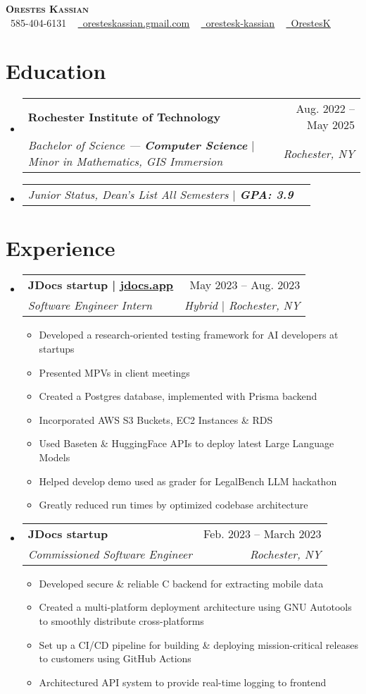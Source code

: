 \documentclass[letterpaper,11pt]{article}
\makeatletter
\newcommand{\resumeItem}[1]{
  \item\small{
    {#1 \vspace{-2pt}}
  }
}
\newcommand{\resumeSubheading}[4]{
  \vspace{-2pt}\item
    \begin{tabular*}{0.97\textwidth}[t]{l@{\extracolsep{\fill}}r}
      \textbf{#1} & #2 \\
      \textit{\small#3} & \textit{\small #4} \\
    \end{tabular*}\vspace{-7pt}
}
\newcommand{\resumeSubSubheading}[2]{
    \item
    \begin{tabular*}{0.97\textwidth}{l@{\extracolsep{\fill}}r}
      \textit{\small#1} & \textit{\small #2} \\
    \end{tabular*}\vspace{-7pt}
}
\newcommand{\resumeSubHeadingListStart}{\begin{itemize}[leftmargin=0.15in, label={}]}
\newcommand{\resumeSubHeadingListEnd}{\end{itemize}}
\newcommand{\resumeItemListStart}{\begin{itemize}}
\newcommand{\resumeItemListEnd}{\end{itemize}\vspace{-5pt}}
\makeatother
\begin{document}
\begin{center}
    \textbf{\Huge \scshape Orestes Kassian} \\ \vspace{4pt}
    \small 
    \faPhone\ 585-404-6131 ~
    \href{oresteskassian@gmail.com}{\faEnvelope\ \uline{oresteskassian.gmail.com}} ~
    \href{https://linkedin.com/in/orestes-kassian}{\faLinkedin\ \uline{orestesk-kassian}} ~
    \href{https://github.com/OrestesK}{\faGithub\ \uline{OrestesK}}
\end{center}
\vspace{-22pt}

\section{Education}
\resumeSubHeadingListStart
    \resumeSubheading
        {Rochester Institute of Technology}{ Aug. 2022 -- May 2025}
        {Bachelor of Science --- \textbf{Computer Science} $|$ Minor in Mathematics, GIS Immersion}{ Rochester, NY}
    \vspace{-8pt}
    \resumeSubSubheading
    {Junior Status, Dean’s List All Semesters $|$ \textbf{GPA: 3.9}}{}
\resumeSubHeadingListEnd

\section{Experience}
\resumeSubHeadingListStart
    \resumeSubheading
    {JDocs startup | \href{https://www.jdocs.app/}{\uline{jdocs.app}}}{ May 2023 -- Aug. 2023}
        {Software Engineer Intern}{ Hybrid $|$ Rochester, NY}
    \resumeItemListStart
        \resumeItem{Developed a research-oriented testing framework for AI developers at startups}
        \resumeItem{Presented MPVs in client meetings}
        \resumeItem{Created a Postgres database, implemented with Prisma backend}
        \resumeItem{Incorporated AWS S3 Buckets, EC2 Instances \& RDS}
        \resumeItem{Used Baseten \& HuggingFace APIs to deploy latest Large Language Models}
        \resumeItem{Helped develop demo used as grader for LegalBench LLM hackathon}
        \resumeItem{Greatly reduced run times by optimized codebase architecture}
    \resumeItemListEnd

    \resumeSubheading
        {JDocs startup}{ Feb. 2023 -- March 2023}
        {Commissioned Software Engineer}{ Rochester, NY}
    \resumeItemListStart
        \resumeItem{Developed secure \& reliable C backend for extracting mobile data}
        \resumeItem{Created a multi-platform deployment architecture using GNU Autotools to smoothly distribute cross-platforms}
        \resumeItem{Set up a CI/CD pipeline for building \& deploying mission-critical releases to customers using GitHub Actions}
        \resumeItem{Architectured API system to provide real-time logging to frontend}
    \resumeItemListEnd
\resumeSubHeadingListEnd
\end{document}
